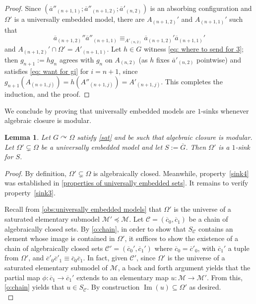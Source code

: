 \documentclass{article}
\newtheorem{lemma}[theorem]{Lemma}
\theoremstyle{remark}
\theoremstyle{definition}
\def\acts{\curvearrowright}
\newcommand{\M}[0]{\mathcal{M}}
\newcommand{\nn}[0]{S}%
\DeclareMathOperator{\im}{Im}
\newcommand{\C}[0]{\mathcal{C}}
\begin{document}
{{{{{\begin{proof}
Since $(\overline{a}''_{(n+1, 1)}; \overline{a}''_{(n+1, {2})}; \overline{a}'_{(n,2)})$ is an absorbing configuration and $\Omega'$ is a universally embedded model, there are $A_{(n+1,2)}'$ and 
$A_{({n+1},1)}'$ such that
\begin{equation}\label{eq: where to send for 3}
\overline{a}_{(n+1,2)}''\overline{a}''_{(n+1,1)}\equiv_{A'_{(n,2)}} \overline{a}_{(n+1,2)}' 
{\overline{a}_{(n+1,1)}'}
\end{equation}
and $A_{(n+1,2)}'\cap \Omega'=A'_{(n+1,1)}$. {Let $h \in G$ witness
  \eqref{eq: where to send for 3}; then $g_{n+1} := h g_n$ agrees with $g_n$
  on $A_{(n,2)}$ (as $h$ fixes $\overline{a}'_{(n,2)}$ pointwise) and
  satisfies \eqref{eq: want for gi} for $i = n+1$, since
  $g_{n+1}(A_{(n+1,j)}) = h(A''_{(n+1,j)}) = A'_{(n+1,j)}$. This completes
  the induction, and the proof.}
  \end{proof}

  {We conclude by proving that universally embedded models are $1$-sinks whenever algebraic closure is modular.}


    
   
  \begin{lemma}\label{universally embedded are sinks}
Let $G\acts\Omega$ satisfy \ref{sat} {and be such that algebraic closure is modular. Let $\Omega'\subsetneq\Omega$ be a universally embedded model and let $S:=\overline{G}$.
Then $\Omega'$ is a $1$-sink for $S$.}
   	
  \end{lemma}
  \begin{proof} %
    By definition, $\Omega' \subsetneq \Omega$ is algebraically closed. Meanwhile,
  property~\ref{sink4} was established in
  \cref{properties of universally embedded sets}. It remains to verify
  property~\ref{sink3}.

  	
  	{Recall from \cref{obs:universally embedded models} that $\Omega'$ is the universe of a saturated elementary submodel $\M'\preceq \M$. Let $\C=(\overline{c}_{0}, \overline{c}_1)$ be a chain of algebraically closed sets.
    By \cref{o:chain}, in order to show that $\nn_{\C}$ contains an element whose image is contained in $\Omega'$, it suffices to show the existence of a chain of algebraically closed sets $\C'=(\overline{c}_{0}', \overline{c}_{1}')$ where $\overline{c}_{0}=\overline{c}'_{0}$, with $\overline{c}_{1}'$ a tuple from $\Omega'$,  and $\overline{c}'_{0}\overline{c}'_{1}\equiv \overline{c}_{0}\overline{c}_{1}$.  In fact, given $\C'$, since $\Omega'$ is the universe of a saturated elementary submodel of $\M$, a back and forth argument yields that the partial map $\phi:\overline{c}_1\to\overline{c}_1'$ extends to an elementary map $u:\M\to\M'$. From this, \cref{o:chain} yields that $u\in\nn_{\C}$. By construction $\im(u)\subseteq\Omega'$ as desired.}\\
   

\end{proof}}}}}}
\end{document}
